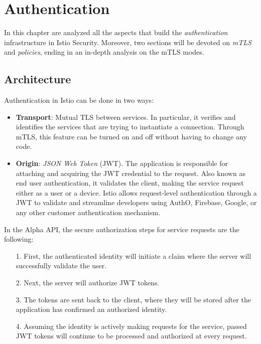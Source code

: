 \chapter{Authentication}
In this chapter are analyzed all the aspects that build the \textit{authentication} infrastructure in Istio Security. Moreover, two sections will be devoted on \textit{mTLS} and \textit{policies}, ending in an in-depth analysis on the mTLS modes.
\minitoc

\section{Architecture}
\label{chap:arch}

Authentication in Istio can be done in two ways:

\begin{itemize}
    \item \textbf{Transport}: Mutual TLS between services. In particular, it verifies and identifies the services that are trying to instantiate a connection. Through mTLS, this feature can be turned on and off without having to change any code.
    \item \textbf{Origin}: \textit{JSON Web Token} (JWT). The application is responsible for attaching and acquiring the JWT credential to the request. Also known as end user authentication, it validates the client, making the service request either as a user or a device. Istio allows request-level authentication through a JWT to validate and streamline developers using AuthO, Firebase, Google, or any other customer authentication mechanism.
\end{itemize}

In the Alpha API, the secure authorization steps for service requests are the following:

\begin{itemize}
    \item[1.] First, the authenticated identity will initiate a claim where the server will successfully validate the user.
    \item[2.] Next, the server will authorize JWT tokens.
    \item[3.] The tokens are sent back to the client, where they will be stored after the application has confirmed an authorized identity.
    \item[4.] Assuming the identity is actively making requests for the service, passed JWT tokens will continue to be processed and authorized at every request.
\end{itemize}

